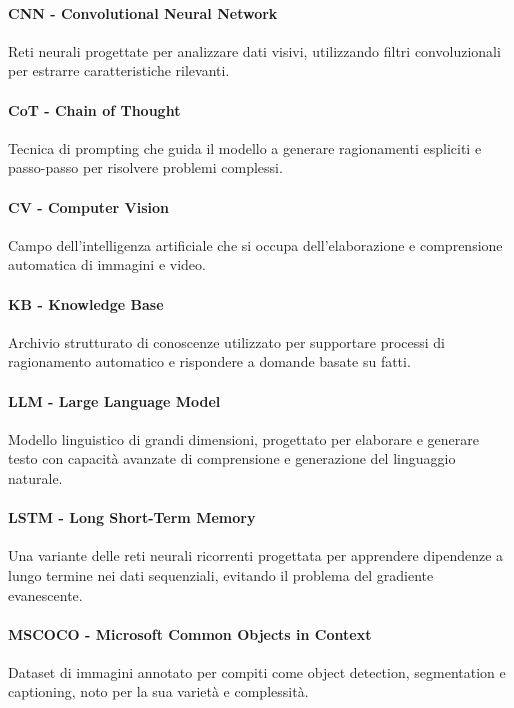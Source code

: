 \documentclass[main.tex]{subfiles}
\begin{document}
\paragraph{CNN - Convolutional Neural Network} 
Reti neurali progettate per analizzare dati visivi, utilizzando filtri convoluzionali per estrarre caratteristiche rilevanti.

\paragraph{CoT - Chain of Thought} 
Tecnica di prompting che guida il modello a generare ragionamenti espliciti e passo-passo per risolvere problemi complessi.

\paragraph{CV - Computer Vision} 
Campo dell'intelligenza artificiale che si occupa dell'elaborazione e comprensione automatica di immagini e video.

\paragraph{KB - Knowledge Base} 
Archivio strutturato di conoscenze utilizzato per supportare processi di ragionamento automatico e rispondere a domande basate su fatti.

\paragraph{LLM - Large Language Model} 
Modello linguistico di grandi dimensioni, progettato per elaborare e generare testo con capacità avanzate di comprensione e generazione del linguaggio naturale.

\paragraph{LSTM - Long Short-Term Memory} 
Una variante delle reti neurali ricorrenti progettata per apprendere dipendenze a lungo termine nei dati sequenziali, evitando il problema del gradiente evanescente.

\paragraph{MSCOCO - Microsoft Common Objects in Context} 
Dataset di immagini annotato per compiti come object detection, segmentation e captioning, noto per la sua varietà e complessità.
\end{document}
